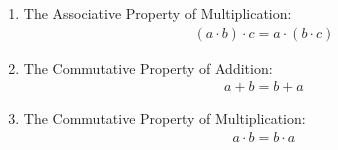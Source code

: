 \documentclass{article}
\begin{document}
\begin{enumerate}
\item The Associative Property of Multiplication:
\begin{align*}
(a \cdot b) \cdot c = a \cdot (b \cdot c)
\end{align*}

\item The Commutative Property of Addition:
\begin{align*}
a + b = b + a
\end{align*}

\item The Commutative Property of Multiplication:
\begin{align*}
a \cdot b = b \cdot a
\end{align*}


\end{enumerate}
\end{document}
